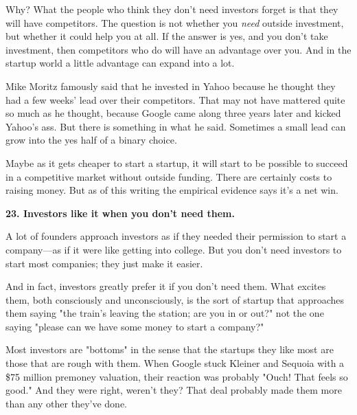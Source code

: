 Why? What the people who
                  think they don't need investors forget is that they will have
                  competitors. The question is not whether you
                  \emph{need} outside investment, but whether it could help you
                  at all. If the answer is yes, and you don't take investment,
                  then competitors who do will have an advantage over you. And
                  in the startup world a little advantage can expand into a
                  lot.

Mike Moritz famously said that he invested in
                  Yahoo because he thought they had a few weeks' lead over their
                  competitors. That may not have mattered quite so much as he
                  thought, because Google came along three years later and
                  kicked Yahoo's ass. But there is something in what he said.
                  Sometimes a small lead can grow into the yes half of a binary
                  choice.

Maybe as it gets cheaper to start a
                  startup, it will start to be possible to succeed in a
                  competitive market without outside funding. There are
                  certainly costs to raising money. But as of this writing the
                  empirical evidence says it's a net win.

\textbf{23. Investors like it when you don't need them.}

A lot of founders approach investors as if they
                  needed their permission to start a company---as if it were
                  like getting into college. But you don't need investors to
                  start most companies; they just make it easier.

And
                  in fact, investors greatly prefer it if you don't need them.
                  What excites them, both consciously and unconsciously, is the
                  sort of startup that approaches them saying "the train's
                  leaving the station; are you in or out?" not the one saying
                  "please can we have some money to start a company?"

Most
                  investors are "bottoms" in the sense that the startups they
                  like most are those that are rough with them. When Google
                  stuck Kleiner and Sequoia with a \$75 million premoney
                  valuation, their reaction was probably "Ouch! That feels so
                  good." And they were right, weren't they? That deal probably
                  made them more than any other they've done.

